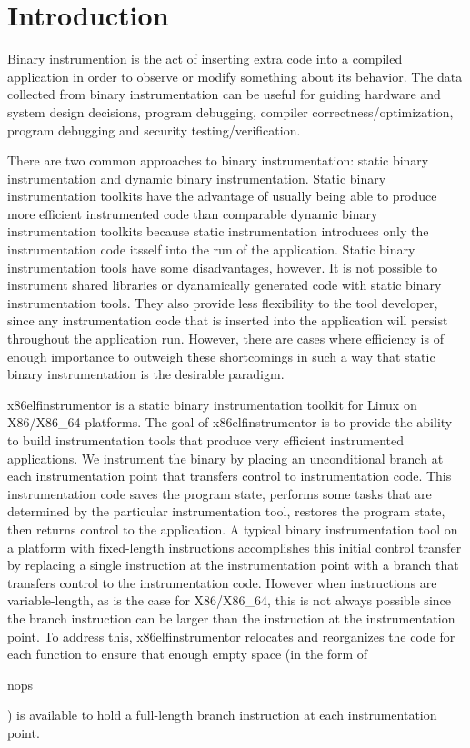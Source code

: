 \section{Introduction}

Binary instrumention is the act of inserting extra code into a compiled
application in order to observe or modify something about its behavior. The data
collected from binary instrumentation can be useful for guiding hardware and
system design decisions, program debugging, compiler correctness/optimization,
program debugging and security testing/verification.

There are two common approaches to binary instrumentation: static binary
instrumentation and dynamic binary instrumentation. Static binary
instrumentation toolkits have the advantage of usually being able to produce
more efficient instrumented code than comparable dynamic binary instrumentation toolkits
because static instrumentation introduces only the instrumentation code itsself into the run of the
application. Static binary instrumentation tools have some disadvantages,
however. It is not possible to instrument shared libraries or dyanamically
generated code with static binary instrumentation tools. They also provide less
flexibility to the tool developer, since any instrumentation code that is
inserted into the application will persist throughout the application run.
However, there are cases where efficiency is of enough importance to outweigh
these shortcomings in such a way that static binary instrumentation is the
desirable paradigm.

x86elfinstrumentor is a static binary instrumentation toolkit for Linux on
X86/X86\_64 platforms. The goal of x86elfinstrumentor is to provide the ability
to build instrumentation tools that produce very efficient instrumented
applications. We instrument the binary by placing an unconditional branch at each instrumentation
point that transfers control to instrumentation code. This instrumentation code saves the
program state, performs some tasks that are determined by the particular instrumentation tool,
restores the program state, then returns control to the application.
A typical binary instrumentation tool on a platform with fixed-length instructions 
\cite{tikir2006pmac} accomplishes this initial control transfer by replacing a
single instruction at the instrumentation point with a branch that transfers
control to the instrumentation code. However when instructions are variable-length, as
is the case for X86/X86\_64, this is not always possible since the branch instruction can be larger than the
instruction at the instrumentation point. To address this, x86elfinstrumentor
relocates and reorganizes the code for each function to ensure that enough empty
space (in the form of \begin{it}nops\end{it}) is available to hold a full-length branch instruction at each
instrumentation point.

